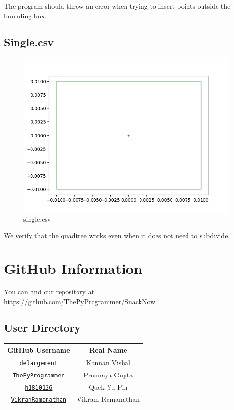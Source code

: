 \documentclass[12pt]{article}
\begin{document}
{The program should throw an error when trying to insert points outside the bounding box.


\subsection{Single.csv}
\begin{figure}
    \centering
    \includegraphics[scale=0.8]{../img/single.png}
    \caption{single.csv}
    \label{fig:my_label}
\end{figure}

We verify that the quadtree works even when it does not need to subdivide.







\newpage
\section{GitHub Information}
You can find our repository at \url{https://github.com/ThePyProgrammer/SnackNow}.

\subsection{User Directory}
\begin{center}
    \begin{tabular}{|c|c|}
        \hline
        GitHub Username & Real Name \\
        \hline
        \href{https://github.com/delargement}{\texttt{delargement}} & Kannan Vishal \\
        \href{https://github.com/ThePyProgrammer}{\texttt{ThePyProgrammer}} & Prannaya Gupta \\
        \href{https://github.com/h1810126}{\texttt{h1810126}} & Quek Yu Pin \\
        \href{https://github.com/VikramRamanathan}{\texttt{VikramRamanathan}} & Vikram Ramanathan \\
        \hline
    \end{tabular}
\end{center}


}
\end{document}
